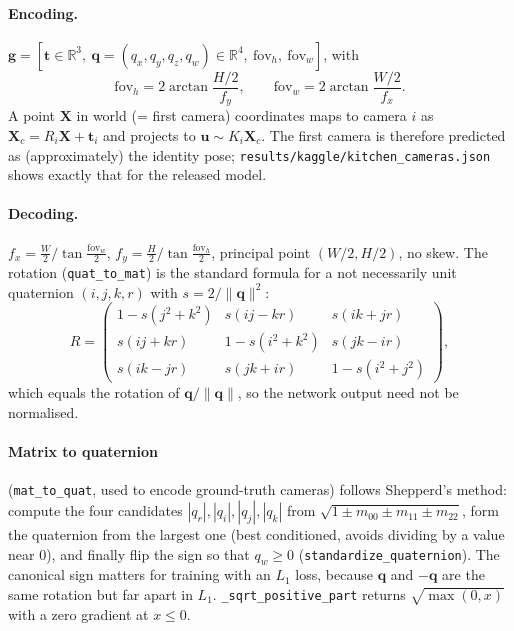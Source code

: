\documentclass[11pt,a4paper]{article}
\begin{document}
\paragraph{Encoding.} $\mathbf{g} = [\mathbf{t}\in\mathbb{R}^3,\ \mathbf{q} = (q_x,q_y,q_z,q_w)\in\mathbb{R}^4,\
\text{fov}_h,\ \text{fov}_w]$, with
\[
  \text{fov}_h = 2\arctan\frac{H/2}{f_y},\qquad \text{fov}_w = 2\arctan\frac{W/2}{f_x}.
\]
A point $\mathbf{X}$ in world (= first camera) coordinates maps to camera $i$ as $\mathbf{X}_{c} = R_i\mathbf{X} + \mathbf{t}_i$
and projects to $\mathbf{u} \sim K_i\mathbf{X}_c$. The first camera is therefore predicted as (approximately) the identity
pose; \texttt{results/kaggle/kitchen\_cameras.json} shows exactly that for the released model.

\paragraph{Decoding.} $f_x = \tfrac{W}{2}\big/\tan\tfrac{\text{fov}_w}{2}$, $f_y = \tfrac{H}{2}\big/\tan\tfrac{\text{fov}_h}{2}$,
principal point $(W/2, H/2)$, no skew. The rotation (\texttt{quat\_to\_mat}) is the standard formula for a not necessarily
unit quaternion $(i,j,k,r)$ with $s = 2/\|\mathbf{q}\|^2$:
\[
  R = \begin{pmatrix}
    1 - s(j^2+k^2) & s(ij - kr) & s(ik + jr)\\
    s(ij + kr) & 1 - s(i^2+k^2) & s(jk - ir)\\
    s(ik - jr) & s(jk + ir) & 1 - s(i^2+j^2)
  \end{pmatrix},
\]
which equals the rotation of $\mathbf{q}/\|\mathbf{q}\|$, so the network output need not be normalised.

\paragraph{Matrix to quaternion} (\texttt{mat\_to\_quat}, used to encode ground-truth cameras) follows Shepperd's method: compute the four
candidates $|q_r|, |q_i|, |q_j|, |q_k|$ from $\sqrt{1\pm m_{00}\pm m_{11}\pm m_{22}}$, form the quaternion from the
largest one (best conditioned, avoids dividing by a value near 0), and finally flip the sign so that $q_w\ge0$
(\texttt{standardize\_quaternion}). The canonical sign matters for training with an $L_1$ loss, because $\mathbf{q}$ and
$-\mathbf{q}$ are the same rotation but far apart in $L_1$. \texttt{\_sqrt\_positive\_part} returns
$\sqrt{\max(0,x)}$ with a zero gradient at $x\le0$.

\end{document}
